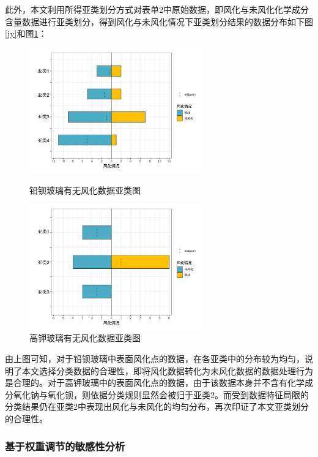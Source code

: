 \documentclass[withoutpreface,bwprint]{cumcmthesis} %
\begin{document}
此外，本文利用所得亚类划分方式对表单2中原始数据，即风化与未风化化学成分含量数据进行亚类划分，得到风化与未风化情况下亚类划分结果的数据分布如下图\ref{jy}和图\ref{jyy}：

\begin{figure}[H]
  \centering
  \begin{minipage}[t]{0.48\textwidth}
    \centering
    \includegraphics[width=7.5cm]{figure/检验2}
    \caption{铅钡玻璃有无风化数据亚类图}
    \label{jy}
  \end{minipage}
  \begin{minipage}[t]{0.48\textwidth}
    \centering
    \includegraphics[width=7.5cm]{figure/检验1}
    \caption{高钾玻璃有无风化数据亚类图}
    \label{jyy}
  \end{minipage}
\end{figure}

由上图可知，对于铅钡玻璃中表面风化点的数据，在各亚类中的分布较为均匀，说明了本文选择分类数据的合理性，即将风化数据转化为未风化数据的数据处理行为是合理的。对于高钾玻璃中的表面风化点的数据，由于该数据本身并不含有化学成分氧化钠与氧化钡，则依据分类规则显然会被归于亚类2。而受到数据特征局限的分类结果仍在亚类2中表现出风化与未风化的均匀分布，再次印证了本文亚类划分的合理性。

\subsubsection{基于权重调节的敏感性分析}
\end{document}
